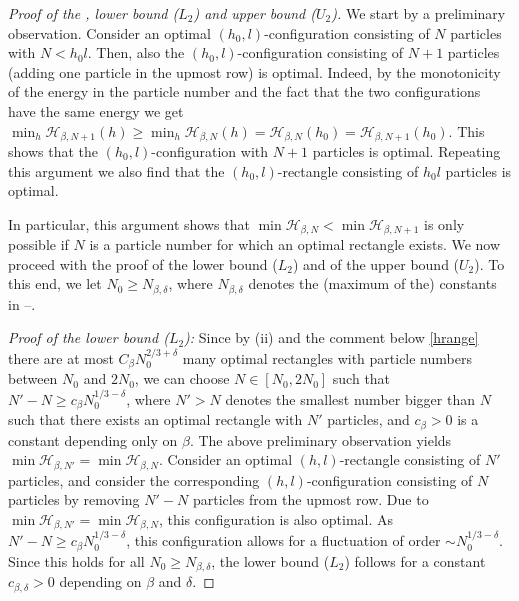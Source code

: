 \documentclass[reqno]{amsart}
\theoremstyle{plain}
\theoremstyle{definition}
\numberwithin{equation}{section}
\begin{document}
\begin{proof}[Proof of the ,   lower bound
  {\rm ($L_2$)} and upper bound   {\rm ($U_2$)}] 
We start by a preliminary observation. Consider an optimal
$(h_0,l)$-configuration consisting of $N$  particles  with  $N
< h_0l$. Then, also the $(h_0,l)$-configuration consisting of $N+1$
 particles  (adding one  particle  in the upmost row) is
optimal. Indeed, by the monotonicity of the energy in the  particle  number
and the fact that the two configurations have the same energy we get
$\min_h \mathcal{H}_{\beta,N+1}(h) \ge \min_h \mathcal{H}_{\beta,N}(h)
=  \mathcal{H}_{\beta,N}(h_0) = \mathcal{H}_{\beta,N+1}(h_0)$. This
shows that the $(h_0,l)$-configuration with $N+1$  particles 
is optimal. Repeating this  argument  we also find that the $(h_0,l)$-rectangle   consisting of $h_0l$  particles  is optimal. 

In particular, this argument shows that  $\min \mathcal{H}_{\beta,N} <
\min \mathcal{H}_{\beta,N+1}$ is only possible if $N$ is a  particle 
number for which an optimal rectangle exists. We now proceed with the
proof of  the lower bound  {\rm ($L_2$)} and of the upper bound
  {\rm ($U_2$)}. To this end, we let $N_0 \ge  N_{\beta,\delta} $, where $ N_{\beta,\delta} $ denotes the (maximum of the) constants in --. 




\emph{Proof of  the lower bound  {\rm ($L_2$)}:} Since by
(ii) and the comment below \eqref{hrange} there
are at most $ C_\beta  N_0^{2/3 + \delta}$ many optimal rectangles
with  particle  numbers between $N_0$ and $2N_0$, we can choose $N \in
[N_0,2N_0]$ such that $N' - N \ge c_\beta  N_0^{1/3-\delta}$, where
$N' > N$ denotes the smallest number bigger than $N$ such that there
exists an optimal rectangle with $N'$  particles,   and $ c_\beta >0$ is a
constant depending only on $\beta$.  The  above  preliminary
observation yields $\min \mathcal{H}_{\beta,N'} = \min
\mathcal{H}_{\beta,N}$. Consider an optimal $(h,l)$-rectangle
consisting of $N'$  particles,   and consider the corresponding
$(h,l)$-configuration consisting of $N$  particles  by removing $N'-N$  particles 
from the upmost row. Due to $\min \mathcal{H}_{\beta,N'} = \min
\mathcal{H}_{\beta,N}$, this configuration is also optimal. As $N' - N
\ge c_\beta  N_0^{1/3-\delta}$, this configuration allows for a
fluctuation of order $\sim N_0^{1/3-\delta}$. Since this holds for all
$N_0 \ge N_{\beta,\delta}  $,  the lower bound  {\rm ($L_2$)} follows for a constant $c_{\beta,\delta}>0$ depending on $\beta$ and $\delta$. 


\end{proof}
\end{document}
